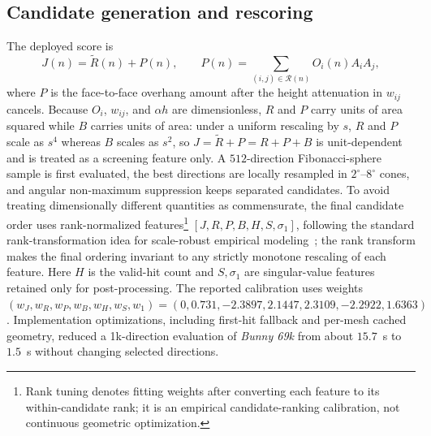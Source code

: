 \documentclass[12pt]{article}
\begin{document}
\subsection{Candidate generation and rescoring}
The deployed score is
\begin{equation}
J(n)=\tilde R(n)+P(n),\qquad
P(n)=\sum_{(i,j)\in\mathcal{R}(n)}O_i(n)A_iA_j,
\end{equation}
where $P$ is the face-to-face overhang amount after the height attenuation in
$w_{ij}$ cancels. Because $O_i$, $w_{ij}$, and $\alpha h$ are dimensionless, $R$ and
$P$ carry units of area squared while $B$ carries units of area: under a uniform
rescaling by $s$, $R$ and $P$ scale as $s^4$ whereas $B$ scales as $s^2$, so
$J=\tilde R+P=R+P+B$ is unit-dependent and is treated as a screening feature only. A
$512$-direction Fibonacci-sphere sample is first evaluated, the best directions are
locally resampled in $2^\circ$--$8^\circ$ cones, and angular non-maximum suppression
keeps separated candidates. To avoid treating dimensionally different quantities as
commensurate, the final candidate order uses rank-normalized
features\footnote{Rank tuning denotes fitting weights after converting each feature
to its within-candidate rank; it is an empirical candidate-ranking calibration, not
continuous geometric optimization.} $[J,R,P,B,H,S,\sigma_1]$, following the standard
rank-transformation idea for scale-robust empirical modeling~\cite{conover1981rank};
the rank transform makes the final ordering invariant to any strictly monotone
rescaling of each feature. Here $H$ is the valid-hit count and $S,\sigma_1$ are
singular-value features retained only for post-processing. The reported calibration
uses weights $(w_J,w_R,w_P,w_B,w_H,w_S,w_1)=(0,0.731,-2.3897,2.1447,2.3109,-2.2922,1.6363)$.
Implementation optimizations, including first-hit fallback and per-mesh cached
geometry, reduced a 1k-direction evaluation of \emph{Bunny 69k} from about $15.7$~s
to $1.5$~s without changing selected directions.
\end{document}
